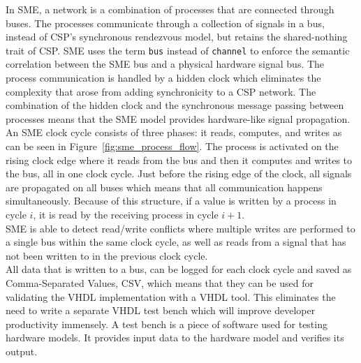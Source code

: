 In SME, a network is a combination of processes that are connected through buses. The processes communicate through a collection of signals in a bus, instead of CSP's synchronous rendezvous model, but retains the shared-nothing trait of CSP.
SME uses the term \texttt{bus} instead of \texttt{channel} to enforce the semantic correlation between the SME bus and a physical hardware signal bus.
The process communication is handled by a hidden clock which eliminates the complexity that arose from adding synchronicity to a CSP network. The combination of the hidden clock and the synchronous message passing between processes means that the SME model provides hardware-like signal propagation.
An SME clock cycle consists of three phases: it reads, computes, and writes as can be seen in Figure~\ref{fig:sme_process_flow}. The process is activated on the rising clock edge where it reads from the bus and then it computes and writes to the bus, all in one clock cycle. Just before the rising edge of the clock, all signals are propagated on all buses which means that all communication happens simultaneously. Because of this structure, if a value is written by a process in cycle $i$, it is read by the receiving process in cycle $i+1$.\\

SME is able to detect read/write conflicts where multiple writes are performed to a single bus within the same clock cycle, as well as reads from a signal that has not been written to in the previous clock cycle.\\

All data that is written to a bus, can be logged for each clock cycle and saved as Comma-Separated Values, CSV, which means that they can be used for validating the VHDL implementation with a VHDL tool. This eliminates the need to write a separate VHDL test bench which will improve developer productivity immensely. A test bench is a piece of software used for testing hardware models. It provides input data to the hardware model and verifies its output.\\

